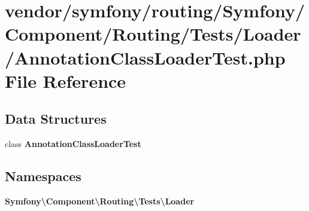 \section{vendor/symfony/routing/\+Symfony/\+Component/\+Routing/\+Tests/\+Loader/\+Annotation\+Class\+Loader\+Test.php File Reference}
\label{_annotation_class_loader_test_8php}
\subsection*{Data Structures}
\begin{DoxyCompactItemize}
\item 
class {\bf Annotation\+Class\+Loader\+Test}
\end{DoxyCompactItemize}
\subsection*{Namespaces}
\begin{DoxyCompactItemize}
\item 
 {\bf Symfony\textbackslash{}\+Component\textbackslash{}\+Routing\textbackslash{}\+Tests\textbackslash{}\+Loader}
\end{DoxyCompactItemize}
